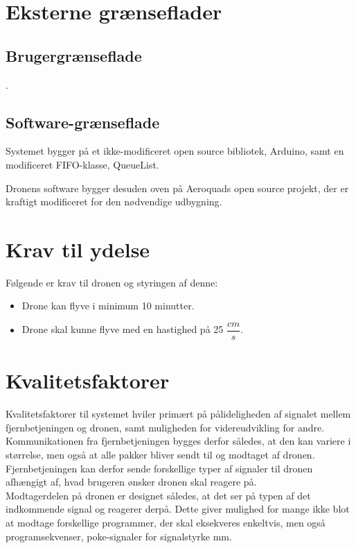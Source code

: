 \documentclass[Main]{subfiles}
\begin{document}
\chapter{Eksterne grænseflader}

\section{Brugergrænseflade}
.



\section{Software-grænseflade}
Systemet bygger på et ikke-modificeret open source bibliotek, Arduino\cite{Arduino}, samt en modificeret FIFO-klasse\cite{FIFO}, QueueList\cite{QueueList}.


Dronens software bygger desuden oven på Aeroquads open source projekt\cite{AQ-software}, der er kraftigt modificeret for den nødvendige udbygning.






\chapter{Krav til ydelse}
Følgende er krav til dronen og styringen af denne:

	\begin{itemize}
	\item Drone kan flyve i minimum 10 minutter.
	\item Drone skal kunne flyve med en hastighed på 25 $\dfrac{cm}{s}$.
	\end{itemize}






\chapter{Kvalitetsfaktorer}
Kvalitetsfaktorer til systemet hviler primært på pålideligheden af signalet mellem fjernbetjeningen og dronen, samt muligheden for videreudvikling for andre.
\\
Kommunikationen fra fjernbetjeningen bygges derfor således, at den kan variere i størrelse, men også at alle pakker bliver sendt til og modtaget af dronen.
Fjernbetjeningen kan derfor sende forskellige typer af signaler til dronen afhængigt af, hvad brugeren ønsker dronen skal reagere på.
\\
Modtagerdelen på dronen er designet således, at det ser på typen af det indkommende signal og reagerer derpå.
Dette giver mulighed for mange ikke blot at modtage forskellige programmer, der skal eksekveres enkeltvis, men også programsekvenser, poke-signaler for signalstyrke mm.
\end{document}
